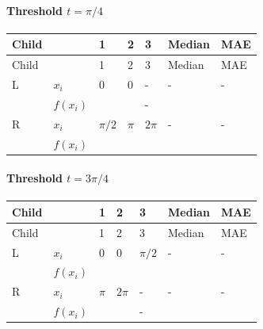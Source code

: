 \documentclass[10pt]{article}
\begin{document}
\paragraph*{Threshold $t=\pi/4$}
\begingroup
\small
\setlength{\tabcolsep}{4pt}
\begin{longtable}{l|l|l|l|l|l|l}
Child &  & 1 & 2 & 3 & Median & MAE \\
\hline
\endfirsthead
Child &  & 1 & 2 & 3 & Median & MAE \\
\hline
\endhead
L & $x_i$ & $0$ & $0$ & - & - & - \\[3pt]
 & $f(x_i)$ & $\phantom{0}$ & $\phantom{0}$ & - & $\phantom{0}$ & $\phantom{0}$ \\[3pt]
R & $x_i$ & $\pi/2$ & $\pi$ & $2\pi$ & - & - \\[3pt]
 & $f(x_i)$ & $\phantom{0}$ & $\phantom{0}$ & $\phantom{0}$ & $\phantom{0}$ & $\phantom{0}$ \\[3pt]
\end{longtable}
\endgroup
\paragraph*{Threshold $t=3\pi/4$}
\begingroup
\small
\setlength{\tabcolsep}{4pt}
\begin{longtable}{l|l|l|l|l|l|l}
Child &  & 1 & 2 & 3 & Median & MAE \\
\hline
\endfirsthead
Child &  & 1 & 2 & 3 & Median & MAE \\
\hline
\endhead
L & $x_i$ & $0$ & $0$ & $\pi/2$ & - & - \\[3pt]
 & $f(x_i)$ & $\phantom{0}$ & $\phantom{0}$ & $\phantom{0}$ & $\phantom{0}$ & $\phantom{0}$ \\[3pt]
R & $x_i$ & $\pi$ & $2\pi$ & - & - & - \\[3pt]
 & $f(x_i)$ & $\phantom{0}$ & $\phantom{0}$ & - & $\phantom{0}$ & $\phantom{0}$ \\[3pt]
\end{longtable}
\endgroup
\end{document}
